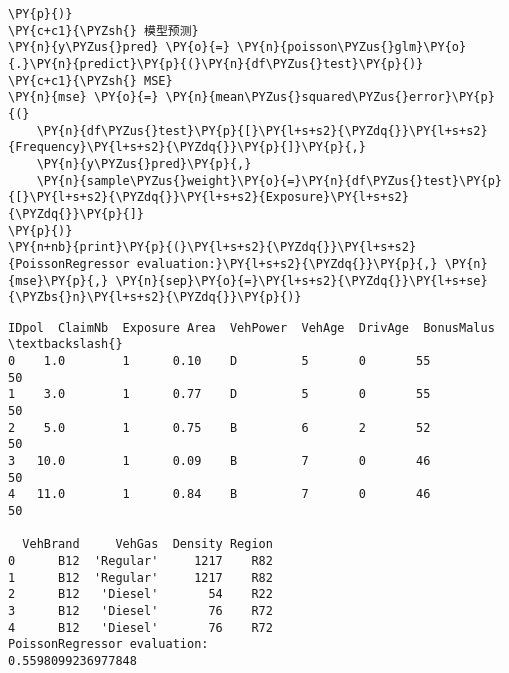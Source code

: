 \begin{Verbatim}[commandchars=\\\{\}]
\PY{p}{)}
\PY{c+c1}{\PYZsh{} 模型预测}
\PY{n}{y\PYZus{}pred} \PY{o}{=} \PY{n}{poisson\PYZus{}glm}\PY{o}{.}\PY{n}{predict}\PY{p}{(}\PY{n}{df\PYZus{}test}\PY{p}{)}
\PY{c+c1}{\PYZsh{} MSE}
\PY{n}{mse} \PY{o}{=} \PY{n}{mean\PYZus{}squared\PYZus{}error}\PY{p}{(}
    \PY{n}{df\PYZus{}test}\PY{p}{[}\PY{l+s+s2}{\PYZdq{}}\PY{l+s+s2}{Frequency}\PY{l+s+s2}{\PYZdq{}}\PY{p}{]}\PY{p}{,} 
    \PY{n}{y\PYZus{}pred}\PY{p}{,} 
    \PY{n}{sample\PYZus{}weight}\PY{o}{=}\PY{n}{df\PYZus{}test}\PY{p}{[}\PY{l+s+s2}{\PYZdq{}}\PY{l+s+s2}{Exposure}\PY{l+s+s2}{\PYZdq{}}\PY{p}{]}
\PY{p}{)}
\PY{n+nb}{print}\PY{p}{(}\PY{l+s+s2}{\PYZdq{}}\PY{l+s+s2}{PoissonRegressor evaluation:}\PY{l+s+s2}{\PYZdq{}}\PY{p}{,} \PY{n}{mse}\PY{p}{,} \PY{n}{sep}\PY{o}{=}\PY{l+s+s2}{\PYZdq{}}\PY{l+s+se}{\PYZbs{}n}\PY{l+s+s2}{\PYZdq{}}\PY{p}{)}
\end{Verbatim}

\begin{Verbatim}[commandchars=\\\{\}]
   IDpol  ClaimNb  Exposure Area  VehPower  VehAge  DrivAge  BonusMalus  \textbackslash{}
0    1.0        1      0.10    D         5       0       55          50
1    3.0        1      0.77    D         5       0       55          50
2    5.0        1      0.75    B         6       2       52          50
3   10.0        1      0.09    B         7       0       46          50
4   11.0        1      0.84    B         7       0       46          50

  VehBrand     VehGas  Density Region
0      B12  'Regular'     1217    R82
1      B12  'Regular'     1217    R82
2      B12   'Diesel'       54    R22
3      B12   'Diesel'       76    R72
4      B12   'Diesel'       76    R72
PoissonRegressor evaluation:
0.5598099236977848
\end{Verbatim}
